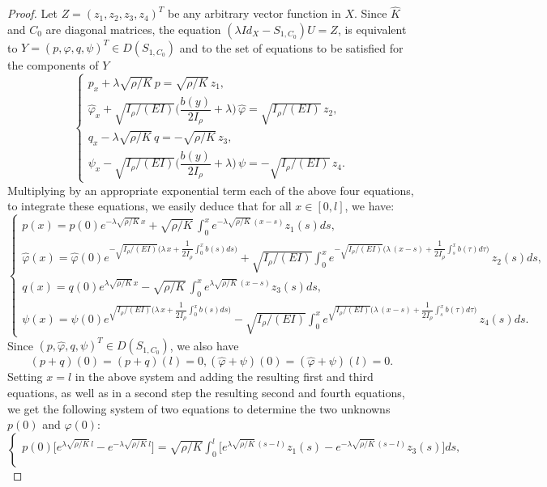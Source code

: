 \documentclass[10pt, english]{article}
\begin{document}
{\begin{proof}
Let  $Z=(z_1,z_2, z_3, z_4)^T$ be any arbitrary vector function in $X$. Since $\widehat{K}$ and $C_0$ are diagonal matrices, the equation $(\lambda Id_X - S_{1,C_0})U=Z$, is equivalent to $Y=(p,\widehat{\varphi}, q, \psi)^T \in D(S_{1,C_0})$ and to the set of equations to be satisfied for the components of $Y$
$$
\begin{cases}
p_x + \lambda \sqrt{\rho/K} \,p= \sqrt{\rho/K}\, z_1,\\
\widehat{\varphi}_x + \sqrt{I_{\rho}/(EI)} \Big(\dfrac{b(y)}{2I_{\rho}} + \lambda\Big)\, \widehat{\varphi}= \sqrt{I_{\rho}/(EI)} \, z_2,\\
q_x - \lambda \sqrt{\rho/K} \, q= -\sqrt{\rho/K} \, z_3,\\
\psi_x - \sqrt{I_{\rho}/(EI)} \Big(\dfrac{b(y)}{2I_{\rho}} + \lambda\Big)\, \psi= -\sqrt{I_{\rho}/(EI)} \, z_4.
\end{cases}
$$
Multiplying by an appropriate exponential term  each of the above four equations, to integrate these equations, we easily deduce that for all $x \in [0,l]$, we have:
$$
\begin{cases}
p(x )=p(0) e^{-\lambda \sqrt{\rho/K} \, x} + \sqrt{\rho/K}\, \int_0^x e^{-\lambda \sqrt{\rho/K} \, (x-s)} z_1(s)ds,\\
\widehat{\varphi}(x)= \widehat{\varphi}(0)e^{- \sqrt{I_{\rho}/(EI)} \Big(\lambda \,x + \dfrac{1}{2I_{\rho}} \int_0^x b(s)ds\Big)
} + \sqrt{I_{\rho}/(EI)} \int_0^x e^{-\sqrt{I_{\rho}/(EI)} \Big(\lambda \,(x-s) + \dfrac{1}{2I_{\rho}} \int_s^x b(\tau)d\tau\Big)
} \, z_2(s)ds,\\
q(x )=q(0) e^{\lambda \sqrt{\rho/K} \, x} - \sqrt{\rho/K}\, \int_0^x e^{\lambda \sqrt{\rho/K} \, (x-s)} z_3(s)ds,\\
\psi(x) = \psi(0) e^{\sqrt{I_{\rho}/(EI)} \Big(\lambda \,x + \dfrac{1}{2I_{\rho}} \int_0^x b(s)ds\Big)
} - \sqrt{I_{\rho}/(EI)} \int_0^x e^{\sqrt{I_{\rho}/(EI)} \Big(\lambda \,(x-s) + \dfrac{1}{2I_{\rho}} \int_s^x b(\tau)d\tau\Big)
} \, z_4(s)ds.
\end{cases}
$$
Since $(p,\widehat{\varphi}, q, \psi)^T \in D(S_{1,C_0})$, we also have
$$
(p+q)(0)=(p+q)(l)=0, (\widehat{\varphi}+\psi)(0)=(\widehat{\varphi}+\psi)(l)=0.
$$
Setting $x=l$ in the above system and adding the resulting first and third equations, as well as in a second step the resulting second and fourth equations, we get
the following system of two equations to determine the two unknowns $p(0)$ and $\widehat{\varphi}(0)$:
$$
\begin{cases}
p(0) \Big [e^{\lambda \sqrt{\rho/K} \, l} - e^{-\lambda \sqrt{\rho/K} \, l} \Big ]= \sqrt{\rho/K} \int_0^l \Big [ e^{\lambda \sqrt{\rho/K} \, (s-l)}z_1(s) - e^{-\lambda \sqrt{\rho/K} \, (s-l)}z_3(s) \Big ]ds,\\

\end{cases}$$
\end{proof}}
\end{document}
